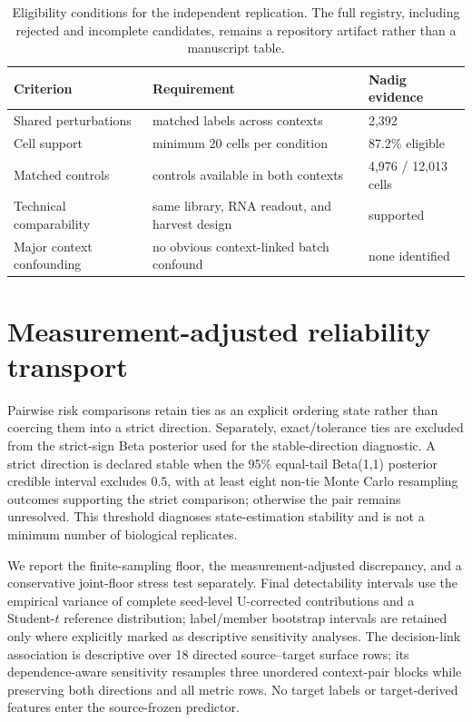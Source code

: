 \documentclass{article}
\begin{document}
\begin{table}[H]
\centering
\small
\caption{Eligibility conditions for the independent replication. The full registry, including rejected and incomplete candidates, remains a repository artifact rather than a manuscript table.}
\label{tab:registry}
\begin{tabular}{lll}
\toprule
Criterion & Requirement & Nadig evidence \\
\midrule
Shared perturbations & matched labels across contexts & 2,392 \\
Cell support & minimum 20 cells per condition & 87.2\% eligible \\
Matched controls & controls available in both contexts & 4,976 / 12,013 cells \\
Technical comparability & same library, RNA readout, and harvest design & supported \\
Major context confounding & no obvious context-linked batch confound & none identified \\
\bottomrule
\end{tabular}
\end{table}

\section{Measurement-adjusted reliability transport}
\label{app:estimators}

Pairwise risk comparisons retain ties as an explicit ordering state rather than coercing them into a strict direction. Separately, exact/tolerance ties are excluded from the strict-sign Beta posterior used for the stable-direction diagnostic. A strict direction is declared stable when the 95\% equal-tail Beta(1,1) posterior credible interval excludes $0.5$, with at least eight non-tie Monte Carlo resampling outcomes supporting the strict comparison; otherwise the pair remains unresolved. This threshold diagnoses state-estimation stability and is not a minimum number of biological replicates.

We report the finite-sampling floor, the measurement-adjusted discrepancy, and a conservative joint-floor stress test separately. Final detectability intervals use the empirical variance of complete seed-level U-corrected contributions and a Student-$t$ reference distribution; label/member bootstrap intervals are retained only where explicitly marked as descriptive sensitivity analyses. The decision-link association is descriptive over 18 directed source--target surface rows; its dependence-aware sensitivity resamples three unordered context-pair blocks while preserving both directions and all metric rows. No target labels or target-derived features enter the source-frozen predictor.
\end{document}
